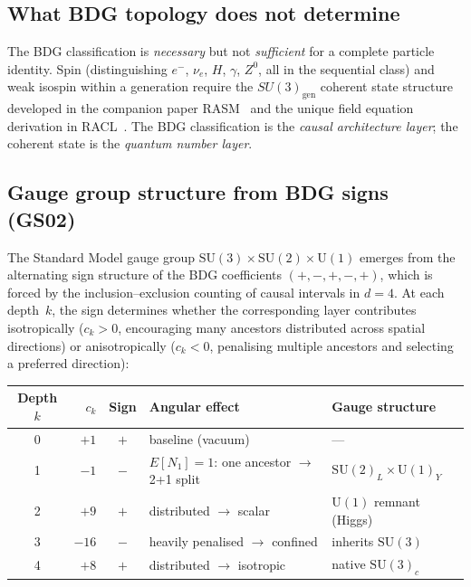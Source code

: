 \documentclass[11pt,a4paper]{article}
\begin{document}
\subsection{What BDG topology does not determine}

The BDG classification is \emph{necessary} but not \emph{sufficient}
for a complete particle identity. Spin (distinguishing $e^-$, $\nu_e$,
$H$, $\gamma$, $Z^0$, all in the sequential class) and weak isospin
within a generation require the $SU(3)_{\mathrm{gen}}$ coherent state
structure developed in the companion paper
RASM~\citep{Sandeman2026RASM} and the unique field equation derivation in RACL~\citep{Sandeman2026RACL}. The BDG classification is the
\emph{causal architecture layer}; the coherent state is the
\emph{quantum number layer}.

\subsection{Gauge group structure from BDG signs (GS02)}
\label{sec:gs02}

The Standard Model gauge group $\mathrm{SU}(3) \times \mathrm{SU}(2) \times \mathrm{U}(1)$ emerges from the alternating sign structure of the BDG coefficients $(+,-,+,-,+)$, which is forced by the inclusion--exclusion counting of causal intervals in $d=4$. At each depth~$k$, the sign determines whether the corresponding layer contributes isotropically ($c_k > 0$, encouraging many ancestors distributed across spatial directions) or anisotropically ($c_k < 0$, penalising multiple ancestors and selecting a preferred direction):

\begin{center}
\begin{tabular}{@{}crcll@{}}
\toprule
Depth $k$ & $c_k$ & Sign & Angular effect & Gauge structure \\
\midrule
0 & $+1$  & $+$ & baseline (vacuum) & --- \\
1 & $-1$  & $-$ & $E[N_1]=1$: one ancestor $\to$ 2+1 split & $\mathrm{SU}(2)_L \times \mathrm{U}(1)_Y$ \\
2 & $+9$  & $+$ & distributed $\to$ scalar & $\mathrm{U}(1)$ remnant (Higgs) \\
3 & $-16$ & $-$ & heavily penalised $\to$ confined & inherits $\mathrm{SU}(3)$ \\
4 & $+8$  & $+$ & distributed $\to$ isotropic & native $\mathrm{SU}(3)_c$ \\
\bottomrule
\end{tabular}
\end{center}
\end{document}
